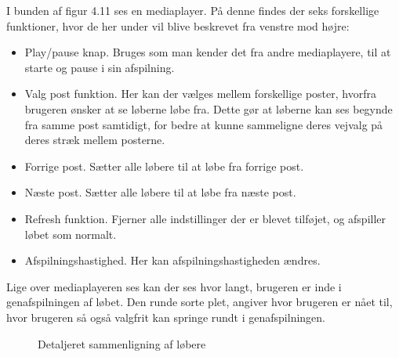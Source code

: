 I bunden af figur 4.11 ses en mediaplayer. På denne findes der seks forskellige funktioner, hvor de her under vil blive beskrevet fra venstre mod højre: 
\begin{itemize}
\item Play/pause knap. Bruges som man kender det fra andre mediaplayere, til at starte og pause i sin afspilning.
\item Valg post funktion. Her kan der vælges mellem forskellige poster, hvorfra brugeren ønsker at se løberne løbe fra. Dette gør at løberne kan ses begynde fra samme post samtidigt, for bedre at kunne sammeligne deres vejvalg på deres stræk mellem posterne.
\item Forrige post. Sætter alle løbere til at løbe fra forrige post.
\item Næste post. Sætter alle løbere til at løbe fra næste post.
\item Refresh funktion. Fjerner alle indstillinger der er blevet tilføjet, og afspiller løbet som normalt.
\item Afspilningshastighed. Her kan afspilningshastigheden ændres.
\end{itemize}
Lige over mediaplayeren ses kan der ses hvor langt, brugeren er inde i genafspilningen af løbet. Den runde sorte plet, angiver hvor brugeren er nået til, hvor brugeren så også valgfrit kan springe rundt i genafspilningen.

\begin{figure}[h]
    \centering
    \caption{Detaljeret sammenligning af løbere}
\end{figure}

